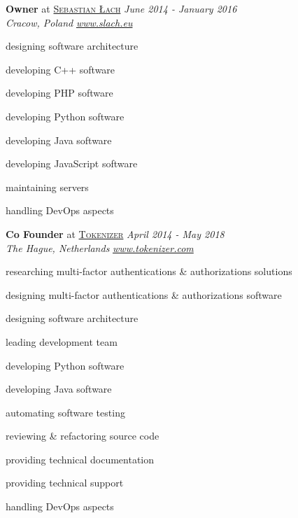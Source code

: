 \documentclass[10pt]{article}
\newenvironment{innerlist}[1][\enskip\textbullet]%
        {\begin{compactitem}[#1]}{\end{compactitem}}
\begin{document}
\textbf{Owner} at \href{http://www.slach.eu/}{\textsc{Sebastian Łach}} \hfill \textit{June 2014 - January 2016} \\
\textit{Cracow, Poland} 
\hfill \href{http://www.slach.eu/}{\textit{www.slach.eu}} 
\vspace{0.1in}
\begin{innerlist}
\item designing software architecture
\item developing C++ software
\item developing PHP software
\item developing Python software
\item developing Java software
\item developing JavaScript software
\item maintaining servers
\item handling DevOps aspects
\end{innerlist}

\pagebreak

\textbf{Co Founder} at \href{https://www.tokenizer.com/}{\textsc{Tokenizer}} \hfill \textit{April 2014 - May 2018} \\
\textit{The Hague, Netherlands}
\hfill \href{https://www.tokenizer.com/}{\textit{www.tokenizer.com}} 
\vspace{0.1in}
\begin{innerlist}
\item researching multi-factor authentications \& authorizations solutions
\item designing multi-factor authentications \& authorizations software
\item designing software architecture
\item leading development team
\item developing Python software
\item developing Java software
\item automating software testing
\item reviewing \& refactoring source code
\item providing technical documentation 
\item providing technical support
\item handling DevOps aspects
\end{innerlist}

\vspace{0.30in}
\end{document}
